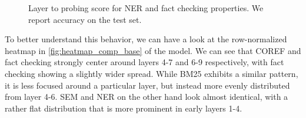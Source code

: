 \begin{figure}[!ht]
    \centering
    \begin{subfigure}{\textwidth}
        \centering
    \end{subfigure}

    \begin{subfigure}{\textwidth}
        \centering
    \end{subfigure}

    \caption{Layer to probing score for NER and fact checking properties. We report accuracy on the test set.}
\end{figure}

To better understand this behavior, we can have a look at the row-normalized heatmap in \autoref{fig:heatmap_comp_base} of the  model. We can see that COREF and fact checking strongly center around layers 4-7 and 6-9 respectively, with fact checking showing a slightly wider spread. While BM25 exhibits a similar pattern, it is less focused around a particular layer, but instead more evenly distributed from layer 4-6. SEM and NER on the other hand look almost identical, with a rather flat distribution that is more prominent in early layers 1-4.

